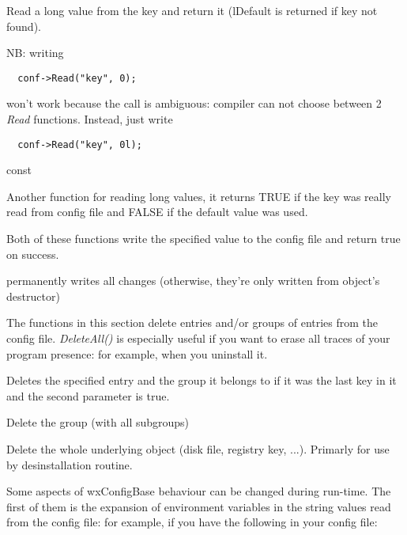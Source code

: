 Read a long value from the key and return it (lDefault is returned if key not
found).

NB: writing
\begin{verbatim}
  conf->Read("key", 0);
\end{verbatim}
won't work because the call is ambiguous: compiler can not choose between 2
{\it Read} functions. Instead, just write
\begin{verbatim}
  conf->Read("key", 0l);
\end{verbatim}

 const

Another function for reading long values, it returns TRUE if the key was
really read from config file and FALSE if the default value was used.


Both of these functions write the specified value to the config file and
return true on success.


permanently writes all changes (otherwise, they're only written from object's
destructor)


The functions in this section delete entries and/or groups of entries from the
config file. {\it DeleteAll()} is especially useful if you want to erase all
traces of your program presence: for example, when you uninstall it.


Deletes the specified entry and the group it belongs to if
it was the last key in it and the second parameter is true.


Delete the group (with all subgroups)


Delete the whole underlying object (disk file, registry key, ...). Primarly
for use by desinstallation routine.


Some aspects of wxConfigBase behaviour can be changed during run-time. The
first of them is the expansion of environment variables in the string values
read from the config file: for example, if you have the following in your
config file:

